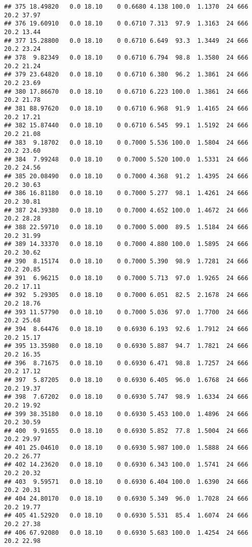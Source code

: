 \documentclass[
]{article}
\begin{document}
\begin{verbatim}
## 375 18.49820   0.0 18.10    0 0.6680 4.138 100.0  1.1370  24 666    20.2 37.97
## 376 19.60910   0.0 18.10    0 0.6710 7.313  97.9  1.3163  24 666    20.2 13.44
## 377 15.28800   0.0 18.10    0 0.6710 6.649  93.3  1.3449  24 666    20.2 23.24
## 378  9.82349   0.0 18.10    0 0.6710 6.794  98.8  1.3580  24 666    20.2 21.24
## 379 23.64820   0.0 18.10    0 0.6710 6.380  96.2  1.3861  24 666    20.2 23.69
## 380 17.86670   0.0 18.10    0 0.6710 6.223 100.0  1.3861  24 666    20.2 21.78
## 381 88.97620   0.0 18.10    0 0.6710 6.968  91.9  1.4165  24 666    20.2 17.21
## 382 15.87440   0.0 18.10    0 0.6710 6.545  99.1  1.5192  24 666    20.2 21.08
## 383  9.18702   0.0 18.10    0 0.7000 5.536 100.0  1.5804  24 666    20.2 23.60
## 384  7.99248   0.0 18.10    0 0.7000 5.520 100.0  1.5331  24 666    20.2 24.56
## 385 20.08490   0.0 18.10    0 0.7000 4.368  91.2  1.4395  24 666    20.2 30.63
## 386 16.81180   0.0 18.10    0 0.7000 5.277  98.1  1.4261  24 666    20.2 30.81
## 387 24.39380   0.0 18.10    0 0.7000 4.652 100.0  1.4672  24 666    20.2 28.28
## 388 22.59710   0.0 18.10    0 0.7000 5.000  89.5  1.5184  24 666    20.2 31.99
## 389 14.33370   0.0 18.10    0 0.7000 4.880 100.0  1.5895  24 666    20.2 30.62
## 390  8.15174   0.0 18.10    0 0.7000 5.390  98.9  1.7281  24 666    20.2 20.85
## 391  6.96215   0.0 18.10    0 0.7000 5.713  97.0  1.9265  24 666    20.2 17.11
## 392  5.29305   0.0 18.10    0 0.7000 6.051  82.5  2.1678  24 666    20.2 18.76
## 393 11.57790   0.0 18.10    0 0.7000 5.036  97.0  1.7700  24 666    20.2 25.68
## 394  8.64476   0.0 18.10    0 0.6930 6.193  92.6  1.7912  24 666    20.2 15.17
## 395 13.35980   0.0 18.10    0 0.6930 5.887  94.7  1.7821  24 666    20.2 16.35
## 396  8.71675   0.0 18.10    0 0.6930 6.471  98.8  1.7257  24 666    20.2 17.12
## 397  5.87205   0.0 18.10    0 0.6930 6.405  96.0  1.6768  24 666    20.2 19.37
## 398  7.67202   0.0 18.10    0 0.6930 5.747  98.9  1.6334  24 666    20.2 19.92
## 399 38.35180   0.0 18.10    0 0.6930 5.453 100.0  1.4896  24 666    20.2 30.59
## 400  9.91655   0.0 18.10    0 0.6930 5.852  77.8  1.5004  24 666    20.2 29.97
## 401 25.04610   0.0 18.10    0 0.6930 5.987 100.0  1.5888  24 666    20.2 26.77
## 402 14.23620   0.0 18.10    0 0.6930 6.343 100.0  1.5741  24 666    20.2 20.32
## 403  9.59571   0.0 18.10    0 0.6930 6.404 100.0  1.6390  24 666    20.2 20.31
## 404 24.80170   0.0 18.10    0 0.6930 5.349  96.0  1.7028  24 666    20.2 19.77
## 405 41.52920   0.0 18.10    0 0.6930 5.531  85.4  1.6074  24 666    20.2 27.38
## 406 67.92080   0.0 18.10    0 0.6930 5.683 100.0  1.4254  24 666    20.2 22.98

\end{verbatim}
\end{document}
